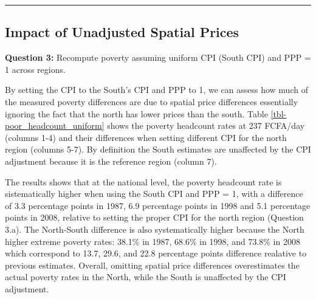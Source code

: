 \documentclass[
  letterpaper,
  DIV=11,
  numbers=noendperiod]{scrartcl}
\begin{document}
\begin{center}\rule{0.5\linewidth}{0.5pt}\end{center}

\subsection{Impact of Unadjusted Spatial
Prices}\label{impact-of-unadjusted-spatial-prices}

\textbf{Question 3:} Recompute poverty assuming uniform CPI (South CPI)
and PPP = 1 across regions.

By setting the CPI to the South's CPI and PPP to 1, we can assess how
much of the measured poverty differences are due to spatial price
differences essentially ignoring the fact that the north has lower
prices than the south. Table \ref{tbl-poor_headcount_uniform} shows the
poverty headcount rates at 237 FCFA/day (columns 1-4) and their
differences when setting different CPI for the north region (columns
5-7). By definition the South estimates are unaffected by the CPI
adjustment because it is the reference region (column 7).

The results shows that at the national level, the poverty headcount rate
is sistematically higher when using the South CPI and PPP = 1, with a
difference of 3.3 percentage points in 1987, 6.9 percentage points in
1998 and 5.1 percentage points in 2008, relative to setting the proper
CPI for the north region (Question 3.a). The North-South difference is
also systematically higher because the North higher extreme poverty
rates: 38.1\% in 1987, 68.6\% in 1998, and 73.8\% in 2008 which
correspond to 13.7, 29.6, and 22.8 percentage points difference
realative to previous estimates. Overall, omitting spatial price
differences overestimates the actual poverty rates in the North, while
the South is unaffected by the CPI adjustment.
\end{document}
